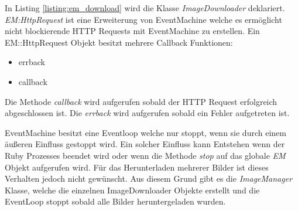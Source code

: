 In Listing \ref{listing:em_download} wird die Klasse \emph{ImageDownloader} deklariert. \emph{EM:HttpRequest} ist eine Erweiterung von EventMachine welche es ermöglicht nicht blockierende HTTP Requests mit EventMachine zu erstellen. Ein EM::HttpRequest Objekt besitzt mehrere Callback Funktionen:

\begin{itemize}
  \item errback
  \item callback
\end{itemize}

Die Methode \emph{callback} wird aufgerufen sobald der HTTP Request erfolgreich abgeschlossen ist. Die \emph{errback} wird aufgerufen sobald ein Fehler aufgetreten ist.

EventMachine besitzt eine Eventloop welche nur stoppt, wenn sie durch einem äußeren Einfluss gestoppt wird. Ein solcher Einfluss kann Entstehen wenn der Ruby Prozesses beendet wird oder wenn die Methode \emph{stop} auf das globale \emph{EM} Objekt aufgerufen wird. Für das Herunterladen mehrerer Bilder ist dieses Verhalten jedoch nicht gewünscht. Aus diesem Grund gibt es die \emph{ImageManager} Klasse, welche die einzelnen ImageDownloader Objekte erstellt und die EventLoop stoppt sobald alle Bilder heruntergeladen wurden. 

